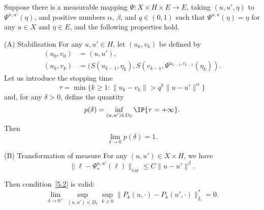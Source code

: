 \begin{theorem} \label{T:1.2}
Suppose there is a measurable mapping $\varPsi:X\times H\times E\to E$, taking $(u,u',\eta)$ to~$\varPsi^{u,u'}(\eta)$, and positive numbers $\alpha$, $\beta$, and $q\in(0,1)$ such that $\varPsi^{u,u}(\eta)=\eta$ for any $u\in X$ and $\eta\in E$, and the following properties hold.
\begin{enonce*}{\hypertarget{(A)}{(A)} Stabilisation}
For any $u,u'\in H$, let $(u_k,v_k)$ be defined by\vspace*{-3pt}
\begin{align}
(u_0,v_0)&=(u,u'), \label{1.8}\\
(u_k,v_k)&=(S(u_{k-1},\eta_k),S(v_{k-1},\varPsi^{u_{k-1},v_{k-1}}(\eta_k)).
\label{1.9}
\end{align}
Let us introduce the stopping time\vspace*{-3pt}
\begin{equation} \label{tau}
\tau=\min\bigl\{k\ge1:\|u_k-v_k\|> q^{k}\|u-u'\|^\alpha\bigr\}
\end{equation}
and, for any $\delta>0$, define the quantity\vspace*{-3pt}
\[
p(\delta)=\inf_{(u,u')\in D_\delta}\IP\{\tau=+\infty\}.
\]
Then\vspace*{-3pt}
\begin{equation} \label{1.10}
\lim_{\delta\to0} p(\delta)=1.
\end{equation}
\end{enonce*}
\begin{enonce*}{\hypertarget{(B)}{(B)} Transformation of measure}
For any $(u,u')\in X\times H$, we have\vspace*{-3pt}
\begin{equation} \label{1.12}
\|\ell-\varPsi_*^{u,u'}(\ell)\|_{\mathrm{var}}\le C \|u-u'\|^\beta.
\end{equation}
\end{enonce*}
Then condition~\eqref{5.2} is valid:\vspace*{-3pt}
\begin{equation} \label{107}
\lim_{\delta\to0^+}\sup_{(u,u')\in D_\delta}\sup_{k\ge0}
\|P_k(u,\cdot)-P_k(u',\cdot)\|_L^*=0.
\end{equation}
\end{theorem}

